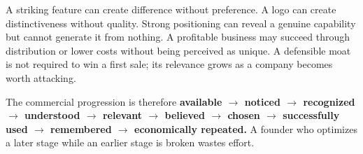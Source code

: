 A striking feature can create difference without preference. A logo can create distinctiveness without quality. Strong positioning can reveal a genuine capability but cannot generate it from nothing. A profitable business may succeed through distribution or lower costs without being perceived as unique. A defensible moat is not required to win a first sale; its relevance grows as a company becomes worth attacking.

The commercial progression is therefore \textbf{available $\to$ noticed $\to$ recognized $\to$ understood $\to$ relevant $\to$ believed $\to$ chosen $\to$ successfully used $\to$ remembered $\to$ economically repeated.} A founder who optimizes a later stage while an earlier stage is broken wastes effort.
